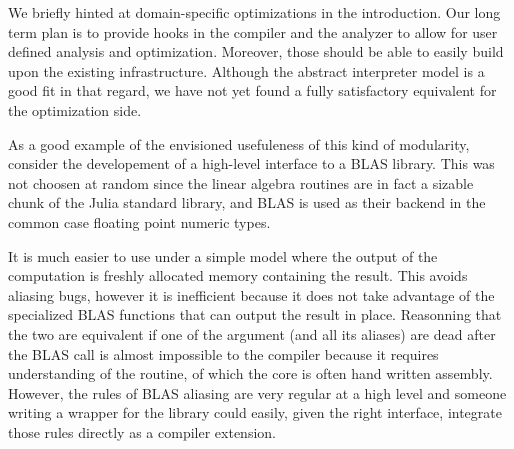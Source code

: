 \documentclass[11pt]{article}
\begin{document}
We briefly hinted at domain-specific optimizations in the introduction.
Our long term plan is to provide hooks in the compiler and the analyzer to allow for user defined analysis and optimization.
Moreover, those should be able to easily build upon the existing infrastructure.
Although the abstract interpreter model is a good fit in that regard, we have not yet found a fully satisfactory equivalent for the optimization side.

As a good example of the envisioned usefuleness of this kind of modularity, consider the developement of a high-level interface to a BLAS library.
This was not choosen at random since the linear algebra routines are in fact a sizable chunk of the Julia standard library, and BLAS is used as their backend in the common case floating point numeric types.

It is much easier to use under a simple model where the output of the computation is freshly allocated memory containing the result. This avoids aliasing bugs, however it is inefficient because it does not take advantage of the specialized BLAS functions that can output the result in place. Reasonning that the two are equivalent if one of the argument (and all its aliases) are dead after the BLAS call is almost impossible to the compiler because it requires understanding of the routine, of which the core is often hand written assembly. However, the rules of BLAS aliasing are very regular at a high level and someone writing a wrapper for the library could easily, given the right interface, integrate those rules directly as a compiler extension.
\end{document}
